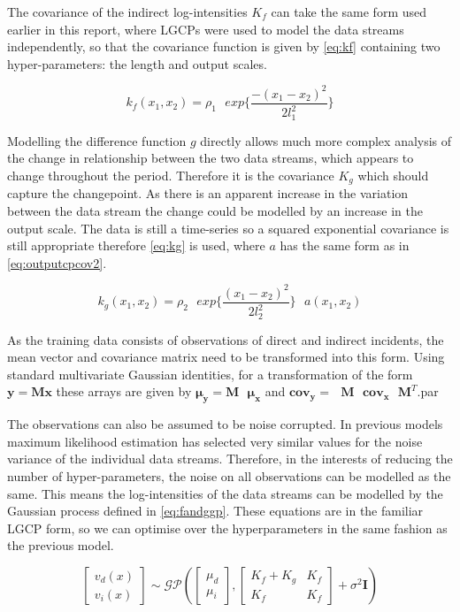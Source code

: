 \documentclass[a4paper,11pt]{report}
\begin{document}
The covariance of the indirect log-intensities \(K_f\) can take the same form used earlier in this report, where LGCPs were used to model the data streams independently, so that the covariance function is given by \ref{eq:kf} containing two hyper-parameters: the length and output scales. 

\begin{equation} \label{eq:kf}
k_f(x_1,x_2) = \rho_1 \text{ }exp\{\frac{-(x_1-x_2)^2}{2 l_1^2}\}
\end{equation}

Modelling the difference function \(g\) directly allows much more complex analysis of the change in relationship between the two data streams, which appears to change throughout the period. Therefore it is the covariance \(K_g\) which should capture the changepoint. As there is an apparent increase in the variation between the data stream the change could be modelled by an increase in the output scale. The data is still a time-series so a squared exponential covariance is still appropriate therefore \ref{eq:kg} is used, where \(a\) has the same form as in \ref{eq:outputcpcov2}.

\begin{equation} \label{eq:kg}
k_g(x_1,x_2) = \rho_2 \text{ }exp\{\frac{(x_1-x_2)^2}{2 l_2^2}\} \text{ } a(x_1,x_2)
\end{equation}


As the training data consists of observations of direct and indirect incidents, the mean vector and covariance matrix need to be transformed into this form. Using standard multivariate Gaussian identities, for a transformation of the form \(\mathbf{y}= \mathbf{M} \mathbf{x}\) these arrays are given by \(\boldsymbol{\mu_y}= \mathbf{M}\text{ }\boldsymbol{\mu_x}\) and \(\mathbf{cov_y}= \text{ }\mathbf{M}\text{ } \mathbf{cov_x} \text{ } \mathbf{M}^{T}\).par

The observations can also be assumed to be noise corrupted. In previous models maximum likelihood estimation has selected very similar values for the noise variance of the individual data streams. Therefore, in the interests of reducing the number of hyper-parameters, the noise on all observations can be modelled as the same. This means the log-intensities of the data streams can be modelled by the Gaussian process defined in \ref{eq:fandggp}. These equations are in the familiar LGCP form, so we can optimise over the hyperparameters in the same fashion as the previous model. 

\begin{equation} \label{eq:fandggp}
\left[ \begin{array}{cc}
v_d(x)  \\
v_i(x) \end{array} \right] \sim \mathcal{G}\mathcal{P} \left( \left[ \begin{array}{cc}
\mu_d  \\
\mu_i \end{array} \right], \left[ \begin{array}{cc}
K_f + K_g & K_f  \\
K_f  & K_f  \end{array} \right] + \sigma^2 \mathbf{I} \right)
\end{equation}
\end{document}

